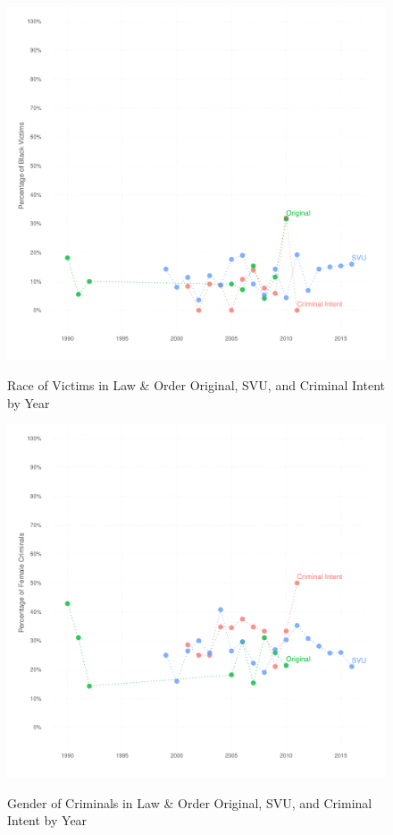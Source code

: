 \documentclass[12pt, letterpaper]{article}
\begin{document}
\begin{figure}[htbp]
\centering
\caption{Race of Victims in Law \& Order Original, SVU, and Criminal Intent by Year}
\includegraphics[scale=.9]{../figs/all_victims_by_race_ts.pdf}
\label{fig:victim_race_ts}
\end{figure}

\begin{figure}[htbp]
\centering
\caption{Gender of Criminals in Law \& Order Original, SVU, and Criminal Intent by Year}
\includegraphics[scale=.9]{../figs/all_criminals_by_gender_ts.pdf}
\label{fig:perp_sex_ts}
\end{figure}
\end{document}
